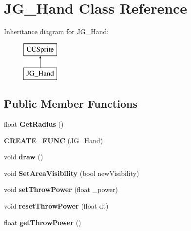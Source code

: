 \hypertarget{class_j_g___hand}{\section{J\-G\-\_\-\-Hand Class Reference}
\label{class_j_g___hand}
}
Inheritance diagram for J\-G\-\_\-\-Hand\-:\begin{figure}[H]
\begin{center}
\leavevmode
\includegraphics[height=2.000000cm]{class_j_g___hand}
\end{center}
\end{figure}
\subsection*{Public Member Functions}
\begin{DoxyCompactItemize}
\item 
\hypertarget{class_j_g___hand_aa66f82060cc53cf1790d2611476c76c0}{float {\bfseries Get\-Radius} ()}\label{class_j_g___hand_aa66f82060cc53cf1790d2611476c76c0}

\item 
\hypertarget{class_j_g___hand_aca220b8f6b4920e9324dd6b3e4f038ab}{{\bfseries C\-R\-E\-A\-T\-E\-\_\-\-F\-U\-N\-C} (\hyperlink{class_j_g___hand}{J\-G\-\_\-\-Hand})}\label{class_j_g___hand_aca220b8f6b4920e9324dd6b3e4f038ab}

\item 
\hypertarget{class_j_g___hand_aaa9078f2418efcb1671166a24b9ade0d}{void {\bfseries draw} ()}\label{class_j_g___hand_aaa9078f2418efcb1671166a24b9ade0d}

\item 
\hypertarget{class_j_g___hand_a4440d1c3bb9b598979b4e122a46a8e78}{void {\bfseries Set\-Area\-Visibility} (bool new\-Visibility)}\label{class_j_g___hand_a4440d1c3bb9b598979b4e122a46a8e78}

\item 
\hypertarget{class_j_g___hand_ae94106097c165b9d0f5230946c28391c}{void {\bfseries set\-Throw\-Power} (float \-\_\-power)}\label{class_j_g___hand_ae94106097c165b9d0f5230946c28391c}

\item 
\hypertarget{class_j_g___hand_a37bde5e1df2f2b1debd974c9b4f330b9}{void {\bfseries reset\-Throw\-Power} (float dt)}\label{class_j_g___hand_a37bde5e1df2f2b1debd974c9b4f330b9}

\item 
\hypertarget{class_j_g___hand_a4130467e71f29612179da0f37ac95b3e}{float {\bfseries get\-Throw\-Power} ()}\label{class_j_g___hand_a4130467e71f29612179da0f37ac95b3e}

\end{DoxyCompactItemize}
